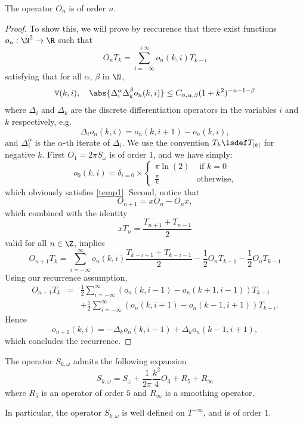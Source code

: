 \documentclass[a4paper]{article}
\begin{document}
	\begin{Lem}
		\label{orderOfOn}
		The operator $O_n$ is of order $n$. 
		\begin{proof}
			To show this, we will prove by reccurence that there exist functions $o_n : \mathbb{\N}^2 \to \R $ such that
			\[O_n T_k = \sum_{i = -\infty}^{+ \infty} o_n(k,i)T_{k-i} \]
			satisfying that for all $\alpha$, $\beta$ in $\N$, \begin{equation}
			\forall (k,i), \quad \abs{\Delta^\alpha_i \Delta^\beta_k o_n(k,i)} \leq C_{n,\alpha,\beta}(1 + k^2)^{-n-1- \beta}
			\label{temp1}
			\end{equation} 
			where $\Delta_i$ and $\Delta_k$ are the discrete differentiation operators in the variables $i$ and $k$ respectively, e.g.
			\[\Delta_i o_n(k,i) =  o_n(k,i+1) -  o_n(k,i),\]
			and $\Delta_i^\alpha$ is the $\alpha$-th iterate of $\Delta_i$. We use the convention $T_k \isdef T_{|k|}$ for negative $k$. 
			First $O_1 = 2\pi S_\omega$ is of order $1$, and we have simply:
			\[o_0(k,i) = \delta_{i = 0} \times\begin{cases}
			\pi \ln(2) & \text{ if } k = 0\\
			\frac{\pi}{k} & \text{otherwise,}
			\end{cases}\] 
			which obviously satisfies \eqref{temp1}. Second, notice that 
			\[O_{n+1} = xO_n -  O_n x,\]
			which combined with the identity 
			\[x T_n = \frac{T_{n+1} + T_{n-1}}{2}\]
			valid for all $n \in \Z$, implies
			\[O_{n+1}T_k = \sum_{i=-\infty}^{\infty} o_n(k,i) \frac{T_{k-i + 1} + T_{k - i - 1}}{2} - \frac{1}{2}O_n T_{k+1} - \frac{1}{2} O_n T_{k-1}\]
			Using our recurrence assumption, 
			\begin{eqnarray*}
				O_{n+1}T_k &=& \frac{1}{2}\sum_{i = -\infty}^{\infty}(o_n(k,i-1) - o_n(k+1,i-1)) T_{k - i}\\
				&&+ \frac{1}{2} \sum_{i = -\infty }^{\infty}(o_n(k,i+1)-o_n(k-1,i+1)) T_{k - i}.
			\end{eqnarray*}
			Hence
			\[o_{n+1}(k,i) = -\Delta_k o_n(k,i-1) + \Delta_k o_n(k-1,i+1),\]
			which concludes the recurrence. 
		\end{proof}
	\end{Lem}
	\begin{Lem}
		The operator $S_{k,\omega}$ admits the following expansion 
		\[ S_{k, \omega} = S_\omega + \frac{1}{2\pi} \frac{k^2}{4} O_3 +  R_5 + R_{\infty}\]
		\label{developpementHankel}
		where $R_5$ is an operator of order $5$ and $R_\infty$ is a smoothing operator.
	\end{Lem}
	In particular, the operator $S_{k,\omega}$ is well defined on $T^{-\infty}$, and is of order $1$.
	
\end{document}
